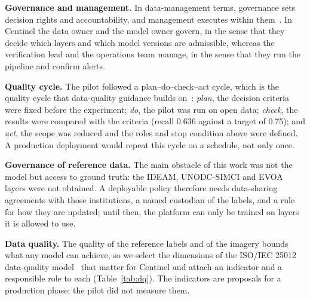 \documentclass{article}
\begin{document}
\textbf{Governance and management.} In data-management terms,
governance sets decision rights and accountability, and management executes
within them~\cite{dama2017}. In Centinel the data owner and the model owner
govern, in the sense that they decide which layers and which model versions are
admissible, whereas the verification lead and the operations team manage, in
the sense that they run the pipeline and confirm alerts.

\textbf{Quality cycle.} The pilot followed a plan--do--check--act cycle, which
is the quality cycle that data-quality guidance builds on~\cite{dama2017}:
\emph{plan}, the decision criteria were fixed before the experiment;
\emph{do}, the pilot was run on open data; \emph{check}, the results were
compared with the criteria (recall 0.636 against a target of 0.75); and
\emph{act}, the scope was reduced and the roles and stop condition above were
defined. A production deployment would repeat this cycle on a schedule, not only
once.

\textbf{Governance of reference data.} The main obstacle of this work was not the
model but access to ground truth: the IDEAM, UNODC-SIMCI and EVOA layers were
not obtained. A deployable policy therefore needs data-sharing agreements with
those institutions, a named custodian of the labels, and a rule for how they are
updated; until then, the platform can only be trained on layers it is allowed to
use.

\textbf{Data quality.} The quality of the reference labels and of the imagery
bounds what any model can achieve, so we select the dimensions of the ISO/IEC
25012 data-quality model~\cite{iso25012} that matter for Centinel and attach an
indicator and a responsible role to each (Table~\ref{tab:dq}). The indicators
are proposals for a production phase; the pilot did not measure them.
\end{document}
